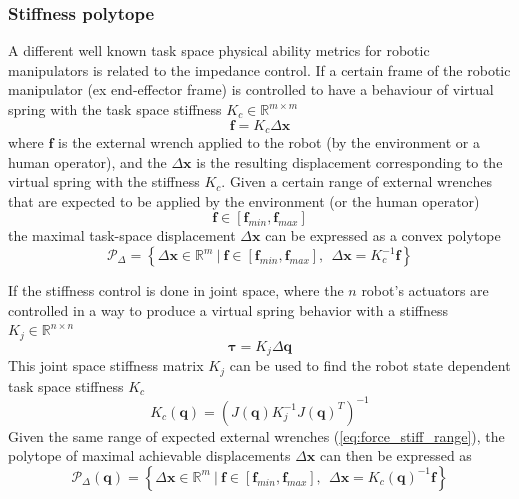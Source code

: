 \subsubsection{Stiffness polytope}
\label{ch:robot_stiffness_poly}
A different well known task space physical ability metrics for robotic manipulators is related to the impedance control. If a certain frame of the robotic manipulator (ex end-effector frame) is controlled to have a behaviour of virtual spring with the task space stiffness $K_c \in \mathbb{R}^{m\times m}$
\begin{equation}
    \bm{f} = K_c \Delta\bm{x}
\end{equation}
where $\bm{f}$ is the  external wrench applied to the robot (by the environment or a human operator), and the $\Delta \bm{x}$ is the resulting displacement corresponding to the virtual spring with the stiffness $K_c$. 
Given a certain range of external wrenches that are expected to be applied by the environment (or the human operator) 
\begin{equation}
    \bm{f}\in\left[\bm{f}_{min}, \bm{f}_{max} \right]
    \label{eq:force_stiff_range}
\end{equation}
the maximal task-space displacement $\Delta \bm{x}$ can be expressed as a convex polytope 
\begin{equation}
    \mathcal{P}_\Delta = \left\{ \Delta\bm{x} \in \mathbb{R}^m ~|~ \bm{f}\in\left[\bm{f}_{min}, \bm{f}_{max} \right], ~~ \Delta\bm{x} = K_c^{-1}\bm{f} \right\}
\end{equation}

If the stiffness control is done in joint space, where the $n$ robot's actuators are controlled in a way to produce a virtual spring behavior with a stiffness $K_j\in \mathbb{R}^{n\times n}$
\begin{equation}
    \bm{\tau} = K_j \Delta\bm{q}
\end{equation}
This joint space stiffness matrix $K_j$ can be used to find the robot state dependent task space stiffness $K_c$ \cite{Salisbury1980}
\begin{equation}
     K_c(\bm{q}) = (J(\bm{q}) K_j^{-1}J(\bm{q})^T)^{-1}
\end{equation}
Given the same range of expected external wrenches (\ref{eq:force_stiff_range}), the polytope of maximal achievable displacements $\Delta\bm{x}$ can then be expressed as
\begin{equation}
    \mathcal{P}_\Delta(\bm{q}) = \left\{ \Delta\bm{x} \in \mathbb{R}^m ~|~ \bm{f}\in\left[\bm{f}_{min}, \bm{f}_{max} \right], ~~ \Delta\bm{x} = K_c(\bm{q})^{-1}\bm{f} \right\}
\end{equation}


